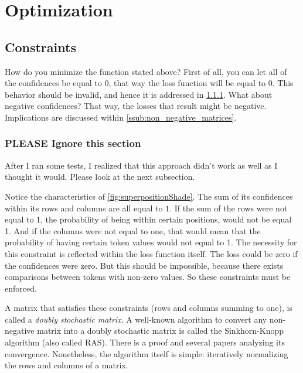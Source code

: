 \section{Optimization}%
\label{sec:optimization}
\subsection{Constraints}%
\label{sub:constraints}
How do you minimize the function stated above? First of all, you can let all of the confidences be equal to $0$, that way the loss function will be equal to $0$. This behavior should be invalid, and hence it is addressed in \ref{ssub:sinkhorn_knopp_algorithm}. What about negative confidences? That way, the losses that result might be negative. Implications are discussed within \ref{ssub:non_negative_matrices}.

\subsubsection{PLEASE Ignore this section}%
\label{ssub:sinkhorn_knopp_algorithm}
After I ran some tests, I realized that this approach didn't work as well as I thought it would. Please look at the next subsection.

Notice the characteristics of \autoref{fig:superpositionShade}. The sum of its confidences within its rows and columns are all equal to $1$. If the sum of the rows were not equal to 1, the probability of being within certain positions, would not be equal 1. And if the columns were not equal to one, that would mean that the probability of having certain token values would not equal to 1. The necessity for this constraint is reflected within the loss function itself. The loss could be zero if the confidences were zero. But this should be impossible, because there exists comparisons between tokens with non-zero values. So these constraints must be enforced.

A matrix that satisfies these constraints (rows and columns summing to one), is called a \emph{doubly stochastic matrix}. A well-known algorithm to convert any non-negative matrix into a doubly stochastic matrix is called the Sinkhorn-Knopp algorithm (also called RAS).\cite{sinkhorn1967concerning} There is a proof\cite{borobia1998matrix} and several papers\cite{chakrabarty2018better,knight2008sinkhorn} analyzing its convergence. Nonetheless, the algorithm itself is simple: iteratively normalizing the rows and columns of a matrix.

